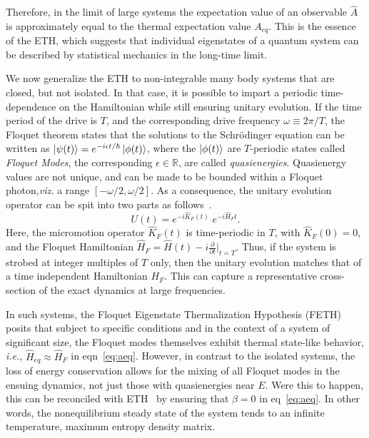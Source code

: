 \documentclass[%
reprint,
superscriptaddress,
amsmath,amssymb,
aps,
prb,
showkeys,
]{revtex4-2}
\begin{document}
Therefore, in the limit of large systems the expectation value of an observable $\hat{A}$ is approximately equal to the thermal expectation value $A_{eq}$. This is the essence of the ETH, which suggests that individual eigenstates of a quantum system can be described by statistical mechanics in the long-time limit.

We now generalize the ETH to non-integrable many body systems that are closed, but not isolated. In that case, it is possible to impart a periodic time-dependence on the Hamiltonian while still ensuring unitary evolution. If the time period of the drive is $T$, and the corresponding drive frequency $\omega\equiv 2\pi/T$, the Floquet theorem states that the solutions to the Schrödinger equation can be written as $\ket{\psi(t)} = e^{-i\epsilon t/\hbar} \ket{\phi(t)}$, where the $\ket{\phi(t)}$ are $T$-periodic states called \textit{Floquet Modes}, the corresponding $\epsilon\in \mathbb{R}$, are called \textit{quasienergies}. Quasienergy values are not unique, and can be made to be bounded within a Floquet photon,\textit{viz.} a range $[-\omega/2, \omega/2]$\cite{holthaus_floquet_2016,vogl_effective_2020}. As a consequence, the unitary evolution operator can be spit into two parts as follows~\cite{Bukov2014}.
\begin{equation}
	U(t) = e^{-i\hat{K}_F(t)}\;e^{-i\hat{H}_Ft}.
\end{equation}
Here, the micromotion operator $\hat{K}_F(t)$ is time-periodic in $T$, with $\hat{K}_F(0)=0$, and the Floquet Hamiltonian $\hat{H}_F = \hat{H}(t) - i \displaystyle\frac{\partial}{\partial t}\bigg\vert_{t=T}$. Thus, if the system is strobed at integer multiples of $T$ only, then the unitary evolution matches that of a time independent Hamiltonian $H_F$. This can capture a representative cross-section of the exact dynamics at large frequencies.

In such systems, the Floquet Eigenstate Thermalization Hypothesis (FETH) posits that subject to specific conditions and in the context of a system of significant size, the Floquet modes themselves exhibit thermal state-like behavior, \textit{i.e.}, $\hat{H}_{eq}\approx \hat{H}_F$ in eqn~\ref{eq:aeq}. However, in contrast to the isolated systems, the loss of energy conservation allows for the mixing of all Floquet modes in the ensuing dynamics, not just those with quasienergies near $E$. Were this to happen, this can be reconciled with ETH~\cite{alessio} by ensuring that $\beta=0$ in eq~\ref{eq:aeq}. In other words, the nonequilibrium steady state of the system tends to an infinite temperature, maximum entropy density matrix.
\end{document}
